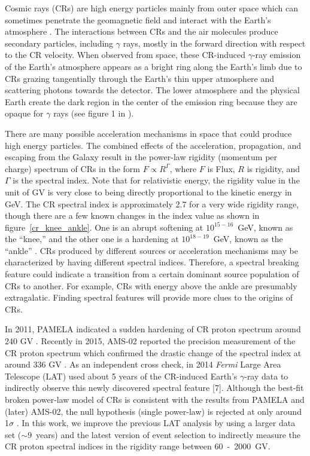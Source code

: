Cosmic rays (CRs) are high energy particles mainly from outer space which can sometimes
penetrate the geomagnetic field and interact with the Earth's atmosphere \cite{HESS,Pacini,Clay}.
The interactions between CRs and the air molecules produce secondary particles,
including $\gamma$ rays, mostly in the forward direction with respect to the CR velocity.
When observed from space, these CR-induced $\gamma$-ray emission of the Earth's
atmosphere appears as a bright ring along the Earth's limb due to CRs grazing
tangentially through the Earth's thin upper atmosphere and scattering photons
towards the detector. The lower atmosphere and the physical Earth create the dark
region in the center of the emission ring because they are opaque
for $\gamma$ rays (see figure 1 in \cite{Warit2009}).

There are many possible acceleration mechanisms in
space that could produce high energy particles.
The combined effects of the acceleration, propagation, and escaping from the Galaxy
result in the power-law rigidity (momentum per charge) spectrum of CRs in the
form $F\propto R^\Gamma$, where $F$ is Flux, $R$ is rigidity, and $\Gamma$ is
the spectral index. Note that for relativistic energy, the rigidity value in
the unit of GV is very close to being directly proportional to the kinetic energy
in GeV. The CR spectral index is approximately 2.7 for a very wide rigidity range,
though there are a few known changes in the index value as shown in figure~\ref{cr_knee_ankle}.
One is an abrupt softening
at $10^{15-16}$~GeV, known as the ``knee,'' \cite{Allan1962,Haungs2003} and the other one is a
hardening at $10^{18-19}$~GeV, known as the ``ankle'' \cite{ABBASI2005271}.
CRs produced by different sources or acceleration mechanisms may be characterized
by having different spectral indices. Therefore, a spectral breaking feature
could indicate a transition from a certain dominant source population of
CRs to another. For example, CRs with energy above the ankle are presumably
extragalatic. Finding spectral features will provide more clues to the origins
of CRs.


In 2011, PAMELA indicated a sudden hardening of CR proton spectrum around 240 GV \cite{PAMELA}.
Recently in 2015, AMS-02 reported the precision measurement of the CR proton spectrum
which confirmed the drastic change of the spectral index at around 336 GV \cite{AMS-02}.
As an independent cross check, in 2014 {\it Fermi} Large Area Telescope (LAT) used
about 5 years of the CR-induced Earth's $\gamma$-ray data to indirectly observe
this newly discovered spectral feature [7]. Although the best-fit broken power-law
model of CRs is consistent with the results from PAMELA and (later) AMS-02, the null
hypothesis (single power-law) is rejected at only around 1$\sigma$ \cite{previouswork}.
In this work, we improve the previous LAT analysis by using a larger data set
($\sim9$~years) and the latest version of event selection to indirectly measure the
CR proton spectral indices in the rigidity range between 60~-~2000~GV.